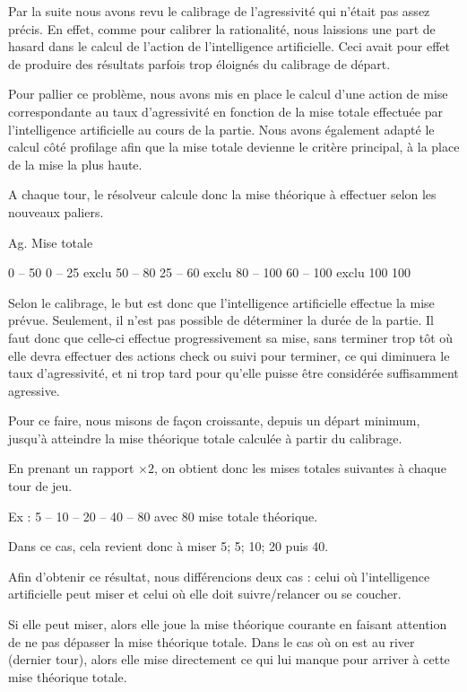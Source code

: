 \documentclass{report}
\begin{document}
\hspace{0.5cm}Par la suite nous avons revu le calibrage de l'agressivité qui n'était pas assez précis. En effet, comme pour calibrer la rationalité, nous laissions une part de hasard dans le calcul de l'action de l'intelligence artificielle. Ceci avait pour effet de produire des résultats parfois trop éloignés du calibrage de départ.\par
Pour pallier ce problème, nous avons mis en place le calcul d'une action de mise correspondante au taux d'agressivité en fonction de la mise totale effectuée par l'intelligence artificielle au cours de la partie. Nous avons également adapté le calcul côté profilage afin que la mise totale devienne le critère principal, à la place de la mise la plus haute.\par
A chaque tour, le résolveur calcule donc la mise théorique à effectuer selon les nouveaux paliers.\par

	Ag.		Mise totale

	0 – 50		0 – 25	exclu
	50 – 80		25 – 60 exclu
	80 – 100	60 – 100 exclu
	100			100

Selon le calibrage, le but est donc que l'intelligence artificielle effectue la mise prévue. Seulement, il n'est pas possible de déterminer la durée de la partie. Il faut donc que celle-ci effectue progressivement sa mise, sans terminer trop tôt où elle devra effectuer des actions check ou suivi pour terminer, ce qui diminuera le taux d'agressivité, et ni trop tard pour qu'elle puisse être considérée suffisamment agressive.\par
Pour ce faire, nous misons de façon croissante, depuis un départ minimum, jusqu'à atteindre la mise théorique totale calculée à partir du calibrage.\par
En prenant un rapport $\times2$, on obtient donc les mises totales suivantes à chaque tour de jeu.\par
Ex : 	5 – 10 – 20 – 40 – 80 		avec 80 mise totale théorique.

Dans ce cas, cela revient donc à miser 5; 5; 10; 20 puis 40.

Afin d'obtenir ce résultat, nous différencions deux cas : celui où l'intelligence artificielle peut miser et celui où elle doit suivre/relancer ou se coucher.\par
Si elle peut miser, alors elle joue la mise théorique courante en faisant attention de ne pas dépasser la mise théorique totale. Dans le cas où on est au river (dernier tour), alors elle mise directement ce qui lui manque pour arriver à cette mise théorique totale.\par
\end{document}
